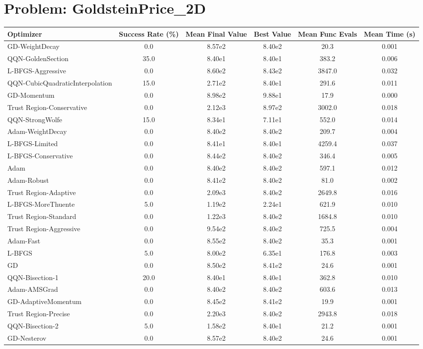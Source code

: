 \documentclass{article}
\begin{document}
\section{Problem: GoldsteinPrice\_2D}
\begin{longtable}{p{3cm}*{5}{c}}
\toprule
\textbf{Optimizer} & \textbf{Success Rate (\%)} & \textbf{Mean Final Value} & \textbf{Best Value} & \textbf{Mean Func Evals} & \textbf{Mean Time (s)} \\
\midrule
GD-WeightDecay & 0.0 & 8.57e2 & 8.40e2 & 20.3 & 0.001 \\
QQN-GoldenSection & 35.0 & 8.40e1 & 8.40e1 & 383.2 & 0.006 \\
L-BFGS-Aggressive & 0.0 & 8.60e2 & 8.43e2 & 3847.0 & 0.032 \\
QQN-CubicQuadraticInterpolation & 15.0 & 2.71e2 & 8.40e1 & 291.6 & 0.011 \\
GD-Momentum & 0.0 & 8.98e2 & 9.88e1 & 17.9 & 0.000 \\
Trust Region-Conservative & 0.0 & 2.12e3 & 8.97e2 & 3002.0 & 0.018 \\
QQN-StrongWolfe & 15.0 & 8.34e1 & 7.11e1 & 552.0 & 0.014 \\
Adam-WeightDecay & 0.0 & 8.40e2 & 8.40e2 & 209.7 & 0.004 \\
L-BFGS-Limited & 0.0 & 8.41e1 & 8.40e1 & 4259.4 & 0.037 \\
L-BFGS-Conservative & 0.0 & 8.44e2 & 8.40e2 & 346.4 & 0.005 \\
Adam & 0.0 & 8.40e2 & 8.40e2 & 597.1 & 0.012 \\
Adam-Robust & 0.0 & 8.41e2 & 8.40e2 & 81.0 & 0.002 \\
Trust Region-Adaptive & 0.0 & 2.09e3 & 8.40e2 & 2649.8 & 0.016 \\
L-BFGS-MoreThuente & 5.0 & 1.19e2 & 2.24e1 & 621.9 & 0.010 \\
Trust Region-Standard & 0.0 & 1.22e3 & 8.40e2 & 1684.8 & 0.010 \\
Trust Region-Aggressive & 0.0 & 9.54e2 & 8.40e2 & 725.5 & 0.004 \\
Adam-Fast & 0.0 & 8.55e2 & 8.40e2 & 35.3 & 0.001 \\
L-BFGS & 5.0 & 8.00e2 & 6.35e1 & 176.8 & 0.003 \\
GD & 0.0 & 8.50e2 & 8.41e2 & 24.6 & 0.001 \\
QQN-Bisection-1 & 20.0 & 8.40e1 & 8.40e1 & 362.8 & 0.010 \\
Adam-AMSGrad & 0.0 & 8.40e2 & 8.40e2 & 603.6 & 0.013 \\
GD-AdaptiveMomentum & 0.0 & 8.45e2 & 8.41e2 & 19.9 & 0.001 \\
Trust Region-Precise & 0.0 & 2.20e3 & 8.40e2 & 2943.8 & 0.018 \\
QQN-Bisection-2 & 5.0 & 1.58e2 & 8.40e1 & 21.2 & 0.001 \\
GD-Nesterov & 0.0 & 8.57e2 & 8.40e2 & 24.6 & 0.001 \\
\bottomrule
\end{longtable}
\end{document}
